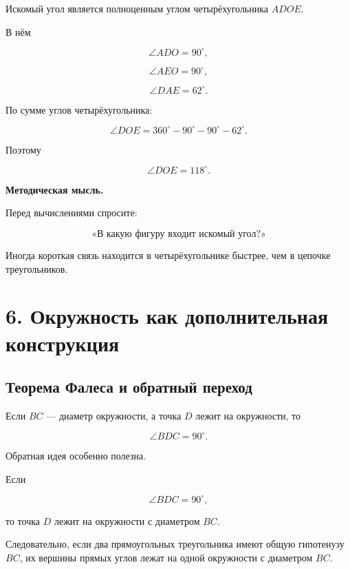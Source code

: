 \documentclass[a4paper,12pt]{article}
\newcommand{\important}[1]{%
  \textbf{\color{darkaccent}#1}%
}
\begin{document}
Искомый угол является полноценным углом
четырёхугольника $ADOE$.

В нём

\[
\angle ADO=90^\circ,
\]

\[
\angle AEO=90^\circ,
\]

\[
\angle DAE=62^\circ.
\]

По сумме углов четырёхугольника:

\[
\angle DOE
=
360^\circ
-
90^\circ
-
90^\circ
-
62^\circ.
\]

Поэтому

\[
\boxed{\angle DOE=118^\circ}.
\]

\important{Методическая мысль.}
Перед вычислениями спросите:

\[
\text{«В какую фигуру входит искомый угол?»}
\]

Иногда короткая связь находится в четырёхугольнике
быстрее, чем в цепочке треугольников.


\clearpage
\section{6. Окружность как дополнительная конструкция}

\subsection{Теорема Фалеса и обратный переход}

Если $BC$ --- диаметр окружности,
а точка $D$ лежит на окружности, то

\[
\boxed{\angle BDC=90^\circ}.
\]

Обратная идея особенно полезна.

Если

\[
\angle BDC=90^\circ,
\]

то точка $D$ лежит на окружности
с диаметром $BC$.

Следовательно, если два прямоугольных треугольника
имеют общую гипотенузу $BC$,
их вершины прямых углов лежат
на одной окружности с диаметром $BC$.

\begin{center}
\end{center}
\end{document}
